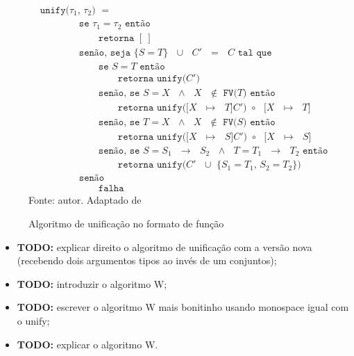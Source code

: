 \begin{figure}[ht!]
  \caption{Algoritmo de unificação no formato de função}
  \centering
  \begin{align*}
    & \texttt{unify($\tau_1$, $\tau_2$) $=$} \\
    & \qquad{}\qquad{}\texttt{se $\tau_1 = \tau_2$ então} \\
    & \qquad{}\qquad{}\qquad{}\texttt{retorna $[\ ]$} \\
    & \qquad{}\qquad{}\texttt{senão, seja $\{ S = T \}$ $\cup$ $C'$ $=$ $C$ tal que} \\
    & \qquad{}\qquad{}\qquad{}\texttt{se $S = T$ então} \\
    & \qquad{}\qquad{}\qquad{}\qquad{}\texttt{retorna unify($C'$)} \\
    & \qquad{}\qquad{}\qquad{}\texttt{senão, se $S = X$ $\land$ $X$ $\notin$ FV($T$) então} \\
    & \qquad{}\qquad{}\qquad{}\qquad{}\texttt{retorna unify($[X$ $\mapsto$ $T]C'$) $\circ$ $[X$ $\mapsto$ $T]$} \\
    & \qquad{}\qquad{}\qquad{}\texttt{senão, se $T = X$ $\land$ $X$ $\notin$ FV($S$) então} \\
    & \qquad{}\qquad{}\qquad{}\qquad{}\texttt{retorna unify($[X$ $\mapsto$ $S]C'$) $\circ$ $[X$ $\mapsto$ $S]$} \\
    & \qquad{}\qquad{}\qquad{}\texttt{senão, se $S = S_1$ $\to$ $S_2$ $\land$ $T = T_1$ $\to$ $T_2$ então}\\
    & \qquad{}\qquad{}\qquad{}\qquad{}\texttt{retorna unify($C'$ $\cup$ \{$S_1 = T_1$,\ $S_2 = T_2$\})} \\
    & \qquad{}\qquad{}\texttt{senão} \\
    & \qquad{}\qquad{}\qquad{}\texttt{falha}
  \end{align*}
  \small{Fonte: autor. Adaptado de~\cite{PIERCE2002}}\label{fig:unify-algo}
\end{figure}

\begin{itemize}
  \item \textbf{TODO:} explicar direito o algoritmo de unificação com a versão nova (recebendo dois argumentos tipos ao invés de um conjuntos);
  \item \textbf{TODO:} introduzir o algoritmo W\@;
  \item \textbf{TODO:} escrever o algoritmo W mais bonitinho usando monospace igual com o unify;
  \item \textbf{TODO:} explicar o algoritmo W\@.
\end{itemize}

